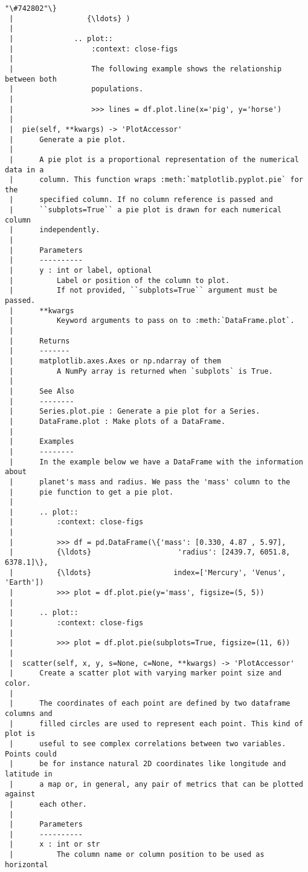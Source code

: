 \documentclass[11pt]{article}
\begin{document}
\begin{Verbatim}[commandchars=\\\{\}]
"\#742802"\}
 |                 {\ldots} )
 |
 |              .. plot::
 |                  :context: close-figs
 |
 |                  The following example shows the relationship between both
 |                  populations.
 |
 |                  >>> lines = df.plot.line(x='pig', y='horse')
 |
 |  pie(self, **kwargs) -> 'PlotAccessor'
 |      Generate a pie plot.
 |
 |      A pie plot is a proportional representation of the numerical data in a
 |      column. This function wraps :meth:`matplotlib.pyplot.pie` for the
 |      specified column. If no column reference is passed and
 |      ``subplots=True`` a pie plot is drawn for each numerical column
 |      independently.
 |
 |      Parameters
 |      ----------
 |      y : int or label, optional
 |          Label or position of the column to plot.
 |          If not provided, ``subplots=True`` argument must be passed.
 |      **kwargs
 |          Keyword arguments to pass on to :meth:`DataFrame.plot`.
 |
 |      Returns
 |      -------
 |      matplotlib.axes.Axes or np.ndarray of them
 |          A NumPy array is returned when `subplots` is True.
 |
 |      See Also
 |      --------
 |      Series.plot.pie : Generate a pie plot for a Series.
 |      DataFrame.plot : Make plots of a DataFrame.
 |
 |      Examples
 |      --------
 |      In the example below we have a DataFrame with the information about
 |      planet's mass and radius. We pass the 'mass' column to the
 |      pie function to get a pie plot.
 |
 |      .. plot::
 |          :context: close-figs
 |
 |          >>> df = pd.DataFrame(\{'mass': [0.330, 4.87 , 5.97],
 |          {\ldots}                    'radius': [2439.7, 6051.8, 6378.1]\},
 |          {\ldots}                   index=['Mercury', 'Venus', 'Earth'])
 |          >>> plot = df.plot.pie(y='mass', figsize=(5, 5))
 |
 |      .. plot::
 |          :context: close-figs
 |
 |          >>> plot = df.plot.pie(subplots=True, figsize=(11, 6))
 |
 |  scatter(self, x, y, s=None, c=None, **kwargs) -> 'PlotAccessor'
 |      Create a scatter plot with varying marker point size and color.
 |
 |      The coordinates of each point are defined by two dataframe columns and
 |      filled circles are used to represent each point. This kind of plot is
 |      useful to see complex correlations between two variables. Points could
 |      be for instance natural 2D coordinates like longitude and latitude in
 |      a map or, in general, any pair of metrics that can be plotted against
 |      each other.
 |
 |      Parameters
 |      ----------
 |      x : int or str
 |          The column name or column position to be used as horizontal

\end{Verbatim}
\end{document}
